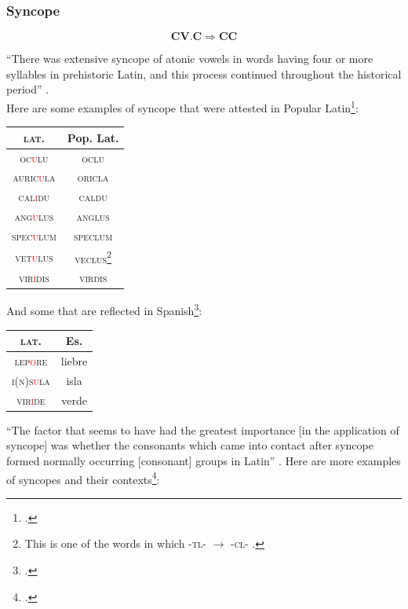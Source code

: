 \documentclass{report}[12pt]
\begin{document}
\subsubsection{Syncope}

\begin{tcolorbox}
   \[ \textbf{C}\textbf{V}.\textbf{C} \Rightarrow \textbf{C}\textbf{C} \]
\end{tcolorbox}

``There was extensive syncope of atonic vowels in words having four or more syllables in prehistoric Latin, and this process continued throughout the historical period'' \parencite[p.~113]{lloyd_spanish}. \\
Here are some examples of syncope that were attested in Popular Latin\footcites[p.~28-29]{romance_his}[p.~114]{lloyd_spanish}:
\begin{center}
\begin{tabular}{c c}
  \textsc{lat.} & Pop. Lat. \\
  \hline
  \textsc{oc\textcolor{red}{u}lu} & \textsc{oclu} \\
  \textsc{auric\textcolor{red}{u}la} & \textsc{oricla} \\
  \textsc{cal\textcolor{red}{i}du} & \textsc{caldu} \\
  \textsc{ang\textcolor{red}{u}lus} & \textsc{anglus} \\
  \textsc{spec\textcolor{red}{u}lum} & \textsc{speclum} \\
  \textsc{vet\textcolor{red}{u}lus} & \textsc{veclus}\footnote{This is one of the words in which \textsc{-tl-} $\rightarrow$ \textsc{-cl-} \parencite[p.~68]{romance_his}.} \\
  \textsc{vir\textcolor{red}{i}dis} & \textsc{virdis} \\
\end{tabular}
\end{center}
And some that are reflected in Spanish\footcite[p.~29]{romance_his}:
\begin{center}
\begin{tabular}{c c}
  \textsc{lat.} & Es. \\
  \hline
  \textsc{lep\textcolor{red}{o}re} & liebre \\
  \textsc{i(n)s\textcolor{red}{u}la} & isla \\
  \textsc{vir\textcolor{red}{i}de} & verde \\
\end{tabular}
\end{center}
``The factor that seems to have had the greatest importance [in the application of syncope] was whether the consonants which came into contact after syncope formed normally occurring [consonant] groups in Latin'' \parencite[p.~114]{lloyd_spanish}. Here are more examples of syncopes and their contexts\footcite[p.~114]{lloyd_spanish}:
\end{document}
